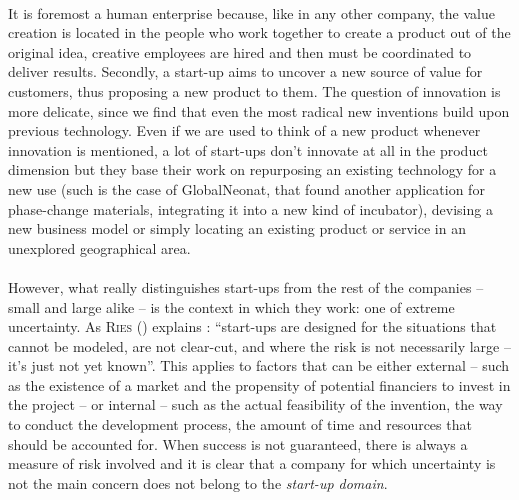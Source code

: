 \documentclass[twoside]{report}
\begin{document}
	\paragraph{}
	It is foremost a human enterprise because, like in any other company, the value creation is located in the people who work together to create a product out of the original idea, creative employees are hired and then must be coordinated to deliver results.  Secondly, a start-up aims to uncover a new source of value for customers, thus proposing a new product to them. The question of innovation is more delicate, since we find that even the most radical new inventions build upon previous technology. Even if we are used to think of a new product whenever innovation is mentioned, a lot of start-ups don't innovate at all in the product dimension but they base their work on repurposing an existing technology for a new use (such is the case of GlobalNeonat, that found another application for phase-change materials, integrating it into a new kind of incubator), devising a new business model or simply locating an existing product or service in an unexplored geographical area. 
	\paragraph{}
However, what really distinguishes start-ups from the rest of the companies – small and large alike – is the context in which they work: one of extreme uncertainty. As \textsc{Ries} (\cite{ries_what_2010}) explains : \enquote{start-ups are designed for the situations that cannot be modeled, are not clear-cut, and where the risk is not necessarily large – it's just not yet known}. This applies to factors that can be either external – such as the existence of a market and the propensity of potential financiers to invest in the project – or internal – such as the actual feasibility of the invention, the way to conduct the development process, the amount of time and resources that should be accounted for. When success is not guaranteed, there is always a measure of risk involved and it is clear that a company for which uncertainty is not the main concern does not belong to the \emph{start-up domain}.
\end{document}
